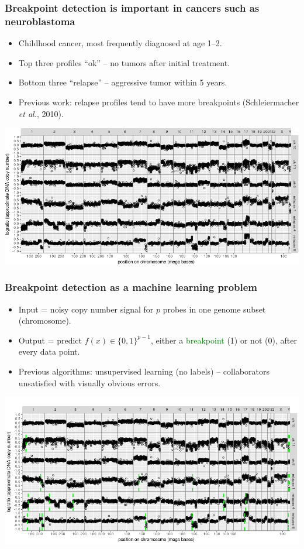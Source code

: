 \documentclass{beamer}
\begin{document}
\begin{frame}
  \frametitle{Breakpoint detection is important in cancers such as
    neuroblastoma } 

  \begin{itemize}
  \item Childhood cancer, most frequently diagnosed at age 1--2.
  \item Top three profiles ``ok'' -- no tumors after initial treatment.
  \item Bottom three ``relapse'' -- aggressive tumor within 5 years.
  \item Previous work: relapse profiles tend to have more breakpoints
     (Schleiermacher {\it et al.}, 2010).
  \end{itemize}

  \includegraphics[width=\textwidth]{neuroblastoma-ok-relapse}
\end{frame}

\begin{frame}
  \frametitle{Breakpoint detection as a machine learning problem}
  
  \begin{itemize}
  \item Input = noisy copy number signal for $p$ probes in one genome
    subset (chromosome).
  \item Output = predict $f(x)\in\{0,1\}^{p-1}$, either a
    \textcolor{green}{breakpoint} (1) or not (0),
    after every data point.
  \item Previous algorithms: unsupervised learning (no labels) --
    collaborators unsatisfied with visually obvious errors.
  \end{itemize}

  \includegraphics[width=\textwidth]{neuroblastoma-ok-relapse-pred}
\end{frame}
\end{document}
